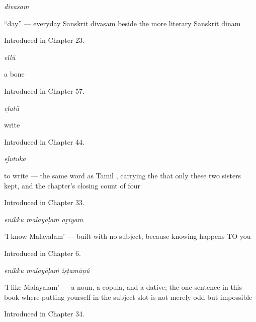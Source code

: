 \noindent\begin{minipage}[t]{\linewidth}
\raggedright
\textbf{}\enspace\emph{divasam}\par
\small \textquotedblleft{}day\textquotedblright{} — everyday Sanskrit divasam beside the more literary Sanskrit dinam\par
\footnotesize Introduced in Chapter 23.
\end{minipage}\par\medskip

\noindent\begin{minipage}[t]{\linewidth}
\raggedright
\textbf{}\enspace\emph{ellŭ}\par
\small a bone\par
\footnotesize Introduced in Chapter 57.
\end{minipage}\par\medskip

\noindent\begin{minipage}[t]{\linewidth}
\raggedright
\textbf{}\enspace\emph{eḻutū}\par
\small write\par
\footnotesize Introduced in Chapter 44.
\end{minipage}\par\medskip

\noindent\begin{minipage}[t]{\linewidth}
\raggedright
\textbf{}\enspace\emph{eḻutuka}\par
\small to write — the same word as Tamil , carrying the  that only these two sisters kept, and the chapter's closing count of four\par
\footnotesize Introduced in Chapter 33.
\end{minipage}\par\medskip

\noindent\begin{minipage}[t]{\linewidth}
\raggedright
\textbf{  }\enspace\emph{enikku malayāḷam aṟiyām}\par
\small 'I know Malayalam' — built with no subject, because knowing happens TO you\par
\footnotesize Introduced in Chapter 6.
\end{minipage}\par\medskip

\noindent\begin{minipage}[t]{\linewidth}
\raggedright
\textbf{  }\enspace\emph{enikku malayāḷaṁ iṣṭamāṇŭ}\par
\small 'I like Malayalam' — a noun, a copula, and a dative; the one sentence in this book where putting yourself in the subject slot is not merely odd but impossible\par
\footnotesize Introduced in Chapter 34.
\end{minipage}\par\medskip

